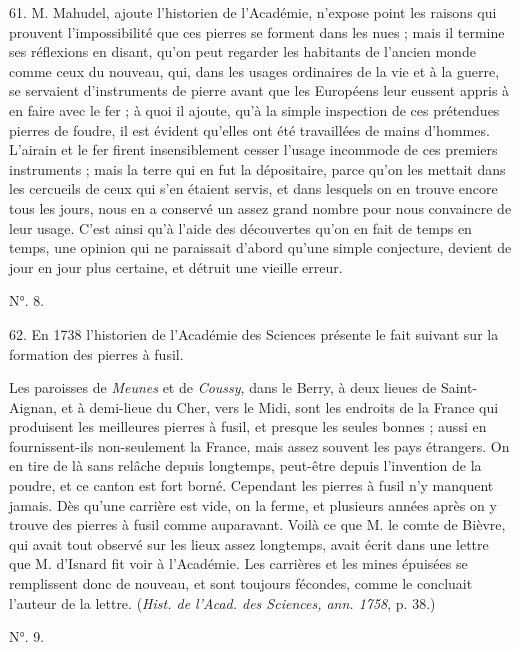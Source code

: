 \documentclass[a4paper, 11pt, oneside, polutonikogreek, french]{article}
\begin{document}
61. M. Mahudel, ajoute l'historien de l'Académie, n'expose point les raisons qui prouvent l'impossibilité que ces pierres se forment dans les nues ; mais il termine ses réflexions en disant, qu'on peut regarder les habitants de l'ancien monde comme ceux du nouveau, qui, dans les usages ordinaires de la vie et à la guerre, se servaient d'instruments de pierre avant que les Européens leur eussent appris à en faire avec le fer ; à quoi il ajoute, qu'à la simple inspection de ces prétendues pierres de foudre, il est évident qu'elles ont été travaillées de mains d'hommes. L'airain et le fer firent insensiblement cesser l'usage incommode de ces premiers instruments ; mais la terre qui en fut la dépositaire, parce qu'on les mettait dans les cercueils de ceux qui s'en étaient servis, et dans lesquels on en trouve encore tous les jours, nous en a conservé un assez grand nombre pour nous convaincre de leur usage. C'est ainsi qu'à l'aide des découvertes qu'on en fait de temps en temps, une opinion qui ne paraissait d'abord qu'une simple conjecture, devient de jour en jour plus certaine, et détruit une vieille erreur.

\begin{center}
N°. 8.
\end{center}

62. En 1738 l'historien de l'Académie des Sciences présente le fait suivant sur la formation des pierres à fusil.

\og Les paroisses de \emph{Meunes} et de \emph{Coussy}, dans le Berry, à deux lieues de Saint-Aignan, et à demi-lieue du Cher, vers le Midi, sont les endroits de la France qui produisent les meilleures pierres à fusil, et presque les seules bonnes ; aussi en fournissent-ils non-seulement la France, mais assez souvent les pays étrangers. On en tire de là sans relâche depuis longtemps, peut-être depuis l'invention de la poudre, et ce canton est fort borné. Cependant les pierres à fusil n'y manquent jamais. Dès qu'une carrière est vide, on la ferme, et plusieurs années après on y trouve des pierres à fusil comme auparavant. Voilà ce que M. le comte de Bièvre, qui avait tout observé sur les lieux assez longtemps, avait écrit dans une lettre que M. d'Isnard fit voir à l'Académie. Les carrières et les mines épuisées se remplissent donc de nouveau, et sont toujours fécondes, comme le concluait l'auteur de la lettre. \fg (\emph{Hist. de l'Acad. des Sciences, ann. 1758}, p. 38.)

\begin{center}
N°. 9.
\end{center}
\end{document}

